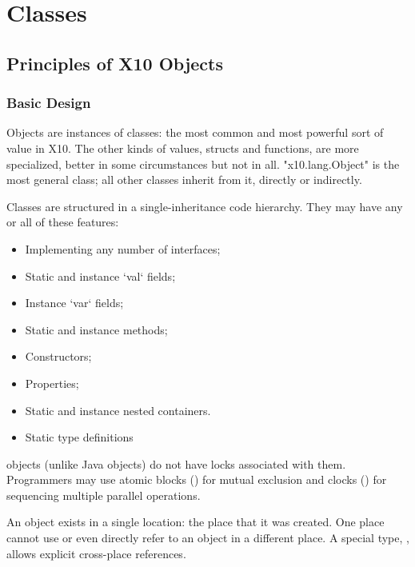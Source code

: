 

\chapter{Classes}
\label{XtenClasses}
\label{ReferenceClasses}





\section{Principles of X10 Objects}\label{XtenObjects}

\subsection{Basic Design}

Objects are instances of classes: the most common and most powerful sort of
value in X10.  The other kinds of values, structs and functions, are more
specialized, better in some circumstances but not in all.
\xcd"x10.lang.Object" is the most general class; all other classes inherit
from it, directly or indirectly. 


Classes are structured in a single-inheritance code
hierarchy.   They may have any or all of these features: 
\begin{itemize}
\item Implementing any number of interfaces;
\item Static and instance \xcd`val` fields; 
\item Instance \xcd`var` fields; 
\item Static and instance methods;
\item Constructors;
\item Properties;
\item Static and instance nested containers.
\item Static type definitions
\end{itemize}


\Xten{} objects (unlike Java objects) do not have locks associated with them.
Programmers may use atomic blocks () for mutual
exclusion and clocks () for sequencing multiple parallel
operations.

An object exists in a single location: the place that it was created.  One
place cannot use or even directly refer to an object in a different place.   A
special type, , allows explicit cross-place references. 

